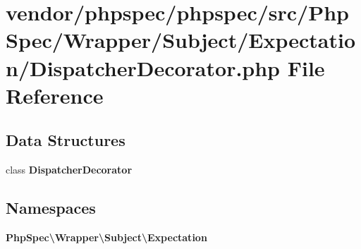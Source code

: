 \section{vendor/phpspec/phpspec/src/\+Php\+Spec/\+Wrapper/\+Subject/\+Expectation/\+Dispatcher\+Decorator.php File Reference}
\label{_dispatcher_decorator_8php}
\subsection*{Data Structures}
\begin{DoxyCompactItemize}
\item 
class {\bf Dispatcher\+Decorator}
\end{DoxyCompactItemize}
\subsection*{Namespaces}
\begin{DoxyCompactItemize}
\item 
 {\bf Php\+Spec\textbackslash{}\+Wrapper\textbackslash{}\+Subject\textbackslash{}\+Expectation}
\end{DoxyCompactItemize}
